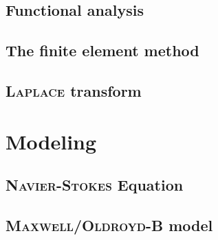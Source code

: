 \documentclass[12pt,a4paper]{scrartcl}
\numberwithin{equation}{section} %
\theoremstyle{definition}
\theoremstyle{plain}
\begin{document}
\subsection{Functional analysis}
\subsection{The finite element method}
\subsection{\textsc{Laplace} transform}
\section{Modeling}
\subsection{\textsc{Navier-Stokes} Equation}
\subsection{\textsc{Maxwell/Oldroyd-B} model}
\end{document}
